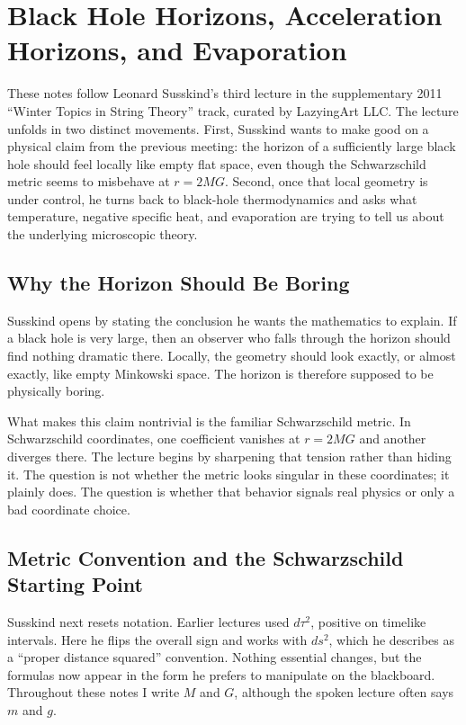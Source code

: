 \chapter{Black Hole Horizons, Acceleration Horizons, and Evaporation}

These notes follow Leonard Susskind's third lecture in the supplementary 2011 ``Winter Topics in String Theory'' track, curated by LazyingArt LLC. The lecture unfolds in two distinct movements. First, Susskind wants to make good on a physical claim from the previous meeting: the horizon of a sufficiently large black hole should feel locally like empty flat space, even though the Schwarzschild metric seems to misbehave at \(r=2MG\). Second, once that local geometry is under control, he turns back to black-hole thermodynamics and asks what temperature, negative specific heat, and evaporation are trying to tell us about the underlying microscopic theory.

\section{Why the Horizon Should Be Boring}

Susskind opens by stating the conclusion he wants the mathematics to explain. If a black hole is very large, then an observer who falls through the horizon should find nothing dramatic there. Locally, the geometry should look exactly, or almost exactly, like empty Minkowski space. The horizon is therefore supposed to be physically boring.

What makes this claim nontrivial is the familiar Schwarzschild metric. In Schwarzschild coordinates, one coefficient vanishes at \(r=2MG\) and another diverges there. The lecture begins by sharpening that tension rather than hiding it. The question is not whether the metric looks singular in these coordinates; it plainly does. The question is whether that behavior signals real physics or only a bad coordinate choice.

\section{Metric Convention and the Schwarzschild Starting Point}

Susskind next resets notation. Earlier lectures used \(d\tau^2\), positive on timelike intervals. Here he flips the overall sign and works with \(ds^2\), which he describes as a ``proper distance squared'' convention. Nothing essential changes, but the formulas now appear in the form he prefers to manipulate on the blackboard. Throughout these notes I write \(M\) and \(G\), although the spoken lecture often says \(m\) and \(g\).


